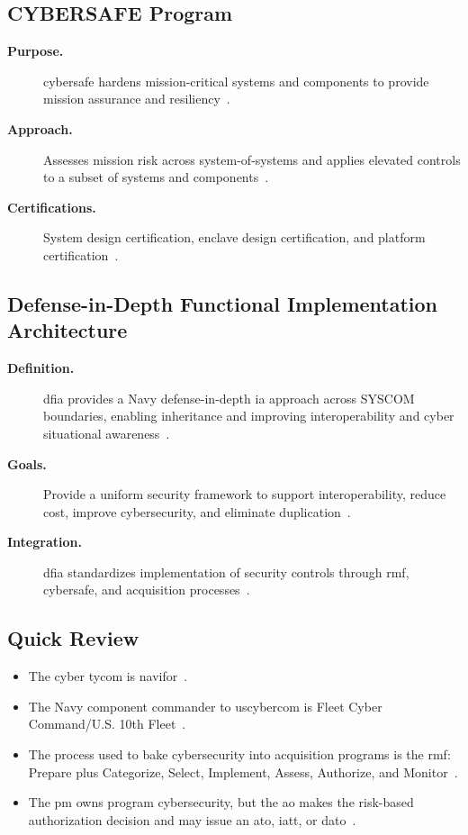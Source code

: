 \documentclass[../main.tex]{subfiles}
\begin{document}
\subsection{CYBERSAFE Program}
\begin{description}
  \item[\textbf{Purpose.}] \ac{cybersafe} hardens mission-critical systems and components to provide mission assurance and resiliency~\autocite{edo-3-4-3-cybersecurity-awareness-2025}.
  \item[\textbf{Approach.}] Assesses mission risk across system-of-systems and applies elevated controls to a subset of systems and components~\autocite{edo-3-4-3-cybersecurity-awareness-2025}.
  \item[\textbf{Certifications.}] System design certification, enclave design certification, and platform certification~\autocite{edo-3-4-3-cybersecurity-awareness-2025}.
\end{description}

\subsection{Defense-in-Depth Functional Implementation Architecture}
\begin{description}
  \item[\textbf{Definition.}] \ac{dfia} provides a Navy defense-in-depth \ac{ia} approach across SYSCOM boundaries, enabling inheritance and improving interoperability and cyber situational awareness~\autocite{edo-3-4-3-cybersecurity-awareness-2025}.
  \item[\textbf{Goals.}] Provide a uniform security framework to support interoperability, reduce cost, improve cybersecurity, and eliminate duplication~\autocite{edo-3-4-3-cybersecurity-awareness-2025}.
  \item[\textbf{Integration.}] \ac{dfia} standardizes implementation of security controls through \ac{rmf}, \ac{cybersafe}, and acquisition processes~\autocite{edo-3-4-3-cybersecurity-awareness-2025}.
\end{description}

\subsection{Quick Review}
\begin{itemize}
  \item The cyber \ac{tycom} is \ac{navifor}~\autocite{edo-3-4-3-cybersecurity-awareness-2025}.
  \item The Navy component commander to \ac{uscybercom} is Fleet Cyber Command/U.S. 10th Fleet~\autocite{edo-3-4-3-cybersecurity-awareness-2025}.
  \item The process used to bake cybersecurity into acquisition programs is the \ac{rmf}: Prepare plus Categorize, Select, Implement, Assess, Authorize, and Monitor~\autocite{DoDI8510-01,edo-3-4-3-cybersecurity-awareness-2025}.
  \item The \ac{pm} owns program cybersecurity, but the \ac{ao} makes the risk-based authorization decision and may issue an \ac{ato}, \ac{iatt}, or \ac{dato}~\autocite{DoDI5000-90,DoDI8510-01,edo-3-4-3-cybersecurity-awareness-2025}.
\end{itemize}
\end{document}
